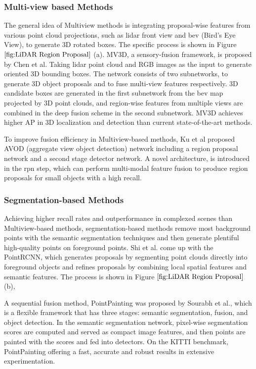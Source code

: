 \subsubsection{Multi-view based Methods}
The general idea of Multiview methods is integrating proposal-wise features from various point cloud projections, such as \acrshort{lidar} front view and \acrshort{bev} (Bird’s Eye View), to generate 3D rotated boxes. The specific process is shown in Figure\(\ref{fig:LiDAR Region Proposal}\) (a). MV3D, a sensory-fusion framework, is proposed by Chen et al.\cite{chen_multi-view_2017} Taking \acrshort{lidar} point cloud and RGB images as the input to generate oriented 3D bounding boxes. The network consists of two subnetworks, to generate 3D object proposals and to fuse multi-view features respectively. 3D candidate boxes are generated in the first subnetwork from the \acrshort{bev} map projected by 3D point clouds, and region-wise features from multiple views are combined in the deep fusion scheme in the second subnetwork. MV3D achieves higher AP in 3D localization and detection than current state-of-the-art methods.

To improve fusion efficiency in Multiview-based methods, Ku et al \cite{ku_joint_2018} proposed AVOD (aggregate view object detection) network including a region proposal network and a second stage detector network. A novel architecture, is introduced in the \acrshort{rpn} step, which can perform multi-modal feature fusion to produce region proposals for small objects with a high recall. 

\subsubsection{Segmentation-based Methods}
Achieving higher recall rates and outperformance in complexed scenes than Multiview-based methods, segmentation-based methods remove most background points with the semantic segmentation techniques and then generate plentiful high-quality points on foreground points. Shi et al. \cite{shi_pointrcnn_2019} come up with the PointRCNN, which generates proposals by segmenting point clouds directly into foreground objects and refines proposals by combining local spatial features and semantic features. The process is shown in Figure \(\ref{fig:LiDAR Region Proposal}\) (b),

A sequential fusion method, PointPainting was proposed by Sourabh et al.\cite{vora_pointpainting_2020}, which is a flexible framework that has three stages: semantic segmentation, fusion, and object detection. In the semantic segmentation network, pixel-wise segmentation scores are computed and served as compact image features, and then points are painted with the scores and fed into detectors. On the KITTI benchmark, PointPainting offering a fast, accurate and robust results in extensive experimentation.

